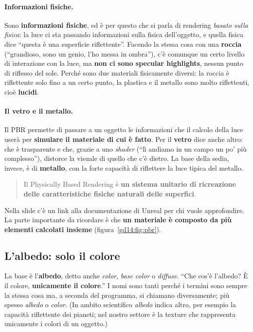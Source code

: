 \paragraph{Informazioni fisiche.} Sono \textbf{informazioni fisiche}, ed è per questo
che si parla di rendering \emph{basato sulla fisica}: la luce ci sta passando
informazioni sulla fisica dell'oggetto, e quella fisica dice ``questa è una
superficie riflettente''. Facendo la stessa cosa con una \textbf{roccia} (``grandioso,
sono un genio, l'ho messa in ombra''), c'è comunque un certo livello di interazione
con la luce, ma \textbf{non ci sono specular highlights}, nessun punto di riflesso
del sole. Perché sono due materiali fisicamente diversi: la roccia è riflettente
solo fino a un certo punto, la plastica e il metallo sono molto riflettenti, cioè
\textbf{lucidi}.

\paragraph{Il vetro e il metallo.} Il PBR permette di passare a un oggetto le
informazioni che il calcolo della luce userà per \textbf{simulare il materiale di cui
è fatto}. Per il \textbf{vetro} dice anche altro: che è trasparente e che, grazie a
uno \emph{shader} (``lì andiamo in un campo un po' più complesso''), distorce la
visuale di quello che c'è dietro. La base della sedia, invece, è di
\textbf{metallo}, con la forte capacità di riflettere la luce tipica del metallo.
\begin{quote}
Il Physically Based Rendering è \textbf{un sistema unitario di ricreazione delle
caratteristiche fisiche naturali delle superfici}.
\end{quote}
Nella slide c'è un link alla documentazione di Unreal per chi vuole approfondire.
La parte importante da ricordare è che \textbf{un materiale è composto da più
elementi calcolati insieme} (figura~\ref{gd14:fig:pbr}).

\subsection{L'albedo: solo il colore}

La base è l'\textbf{albedo}, detto anche \emph{color}, \emph{base color} o
\emph{diffuse}. ``Che cos'è l'albedo? È il colore, \textbf{unicamente il
colore}.'' I nomi sono tanti perché i termini sono sempre la stessa cosa ma, a
seconda del programma, si chiamano diversamente; più spesso \emph{albedo} o
\emph{color}. (In ambito scientifico \emph{albedo} indica altro, per esempio la
capacità riflettente dei pianeti; nel nostro settore è la texture che rappresenta
unicamente i colori di un oggetto.)

